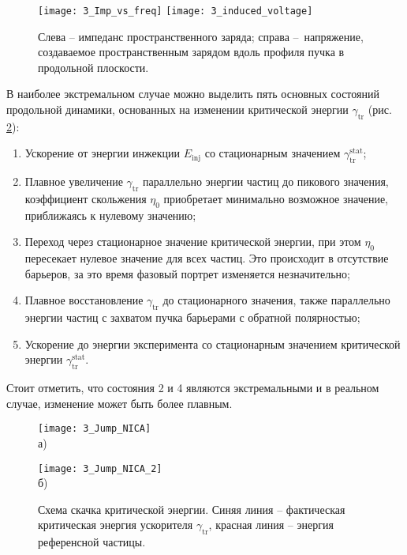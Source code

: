 \begin{figure}[!h]
   \texttt{[image: 3\_Imp\_vs\_freq]}
   \texttt{[image: 3\_induced\_voltage]}
   \caption{Слева – импеданс пространственного заряда; справа – напряжение, создаваемое пространственным 
   зарядом вдоль профиля пучка в продольной плоскости. }
   \label{fig:signal}
\end{figure}

В наиболее экстремальном случае можно выделить пять основных состояний продольной динамики, основанных на изменении критической энергии
$\gamma_{\textrm{tr}}$ (рис. \ref{fig:jump_NICA}):

\begin{enumerate} 
  \item Ускорение от энергии инжекции $E_{\textrm{inj}}$ со стационарным значением $\gamma_{\textrm{tr}}^{\textrm{stat}}$;
  \item  Плавное увеличение $\gamma_{\textrm{tr}}$ параллельно энергии частиц до пикового значения, коэффициент скольжения $\eta_0$ приобретает минимально возможное значение, приближаясь к нулевому значению;
  \item Переход через стационарное значение критической энергии, при этом $\eta_0$ пересекает нулевое значение для всех частиц. Это происходит в отсутствие барьеров, за это время фазовый портрет изменяется незначительно;
  \item Плавное восстановление $\gamma_{\textrm{tr}}$ до стационарного значения, также па\-рал\-лель\-но энергии частиц с захватом пучка барьерами с обратной полярностью;
  \item Ускорение до энергии эксперимента со стационарным значением критической энергии $\gamma_{\textrm{tr}}^{\textrm{stat}}$.
\end{enumerate}

\noindent Стоит отметить, что состояния 2 и 4 являются экстремальными и в реальном случае, изменение может быть более плавным.

\begin{figure}[!h]
    \begin{minipage}[b][][b]{0.49\linewidth}\centering
        \texttt{[image: 3\_Jump\_NICA]} \\ а)
    \end{minipage}
    \hfill
    \begin{minipage}[b][][b]{0.49\linewidth}\centering
        \texttt{[image: 3\_Jump\_NICA\_2]} \\ б)
    \end{minipage}
    \caption{Схема скачка критической энергии. Синяя линия – фактическая критическая энергия ускорителя $\gamma_{\textrm{tr}}$, красная линия – энергия референсной частицы.}
    \label{fig:jump_NICA}
\end{figure}

